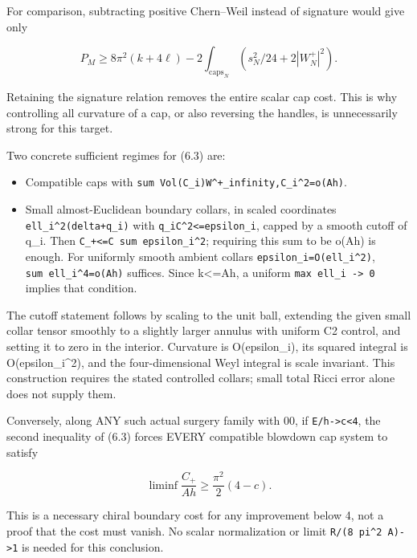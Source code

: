\documentclass[
  10pt,
]{article}
\providecommand{\tightlist}{%
  \setlength{\itemsep}{0pt}\setlength{\parskip}{0pt}}
\begin{document}
For comparison, subtracting positive Chern--Weil instead of signature
would give only

\[
 P_M\ge8\pi^2(k+4\ell)
          -2\int_{\mathrm{caps}_N}(s_N^2/24+2|W_N^+|^2).
\]

Retaining the signature relation removes the entire scalar cap cost.
This is why controlling all curvature of a cap, or also reversing the
handles, is unnecessarily strong for this target.

Two concrete sufficient regimes for (6.3) are:

\begin{itemize}
\tightlist
\item
  Compatible caps with
  \texttt{sum\ Vol(C\_i)\textbar{}\textbar{}W\^{}+\textbar{}\textbar{}\_infinity,C\_i\^{}2=o(Ah)}.
\item
  Small almost-Euclidean boundary collars, in scaled coordinates
  \texttt{ell\_i\^{}2(delta+q\_i)} with
  \texttt{\textbar{}\textbar{}q\_i\textbar{}\textbar{}C\^{}2\textless{}=epsilon\_i},
  capped by a smooth cutoff of q\_i. Then
  \texttt{C\_+\textless{}=C\ sum\ epsilon\_i\^{}2}; requiring this sum
  to be o(Ah) is enough. For uniformly smooth ambient collars
  \texttt{epsilon\_i=O(ell\_i\^{}2)}, \texttt{sum\ ell\_i\^{}4=o(Ah)}
  suffices. Since k\textless=Ah, a uniform
  \texttt{max\ ell\_i\ -\textgreater{}\ 0} implies that condition.
\end{itemize}

The cutoff statement follows by scaling to the unit ball, extending the
given small collar tensor smoothly to a slightly larger annulus with
uniform C2 control, and setting it to zero in the interior. Curvature is
O(epsilon\_i), its squared integral is O(epsilon\_i\^{}2), and the
four-dimensional Weyl integral is scale invariant. This construction
requires the stated controlled collars; small total Ricci error alone
does not supply them.

Conversely, along ANY such actual surgery family with 00, if
\texttt{E/h-\textgreater{}c\textless{}4}, the second inequality of (6.3)
forces EVERY compatible blowdown cap system to satisfy

\[
                \liminf\frac{C_+}{Ah}
                              \ge\frac{\pi^2}{2}(4-c). \tag{6.6}
\]

This is a necessary chiral boundary cost for any improvement below 4,
not a proof that the cost must vanish. No scalar normalization or limit
\texttt{R/(8\ pi\^{}2\ A)-\textgreater{}1} is needed for this
conclusion.
\end{document}
